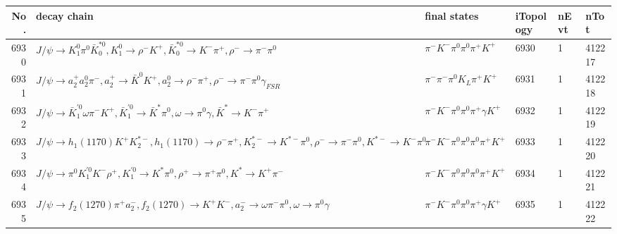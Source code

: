 \begin{table}[htbp] 
\begin{center}
\begin{small}
\begin{tabular}{rlllll}\hline\hline
 No. & decay chain & final states &  iTopology & nEvt & nTot \\\hline
6930&$J/\psi       \rightarrow K_1^{0}        \pi^{0}        \bar{K}_0^{*0}, K_1^{0}         \rightarrow \rho^{-}      K^{+}          , \bar{K}_0^{*0} \rightarrow K^{-}          \pi^{+}        , \rho^{-}       \rightarrow \pi^{-}        \pi^{0}        $&$\pi^{-}        K^{-}          \pi^{0}        \pi^{0}        \pi^{+}        K^{+}          $& 6930&    1&412217\\
6931&$J/\psi       \rightarrow a_{2}^{+}      a_{2}^{0}      \pi^{-}        , a_{2}^{+}       \rightarrow \bar{K}^{0}   K^{+}          , a_{2}^{0}       \rightarrow \rho^{-}      \pi^{+}        , \rho^{-}       \rightarrow \pi^{-}        \pi^{0}        \gamma_{FSR} $&$\pi^{-}        \pi^{-}        \pi^{0}        K_{L}          \pi^{+}        K^{+}          $& 6931&    1&412218\\
6932&$J/\psi       \rightarrow \bar{K}_1^{'0}\omega         \pi^{-}        K^{+}          , \bar{K}_1^{'0} \rightarrow \bar{K}^{*}   \pi^{0}        , \omega          \rightarrow \pi^{0}        \gamma       , \bar{K}^{*}    \rightarrow K^{-}          \pi^{+}        $&$\pi^{-}        K^{-}          \pi^{0}        \pi^{0}        \pi^{+}        \gamma       K^{+}          $& 6932&    1&412219\\
6933&$J/\psi       \rightarrow h_{1}(1170)    K^{+}          K_2^{*-}       , h_{1}(1170)     \rightarrow \rho^{-}      \pi^{+}        , K_2^{*-}        \rightarrow K^{*-}         \pi^{0}        , \rho^{-}       \rightarrow \pi^{-}        \pi^{0}        , K^{*-}          \rightarrow K^{-}          \pi^{0}        $&$\pi^{-}        K^{-}          \pi^{0}        \pi^{0}        \pi^{0}        \pi^{+}        K^{+}          $& 6933&    1&412220\\
6934&$J/\psi       \rightarrow \pi^{0}        K_1^{'0}      K^{-}          \rho^{+}      , K_1^{'0}       \rightarrow K^{*}          \pi^{0}        , \rho^{+}       \rightarrow \pi^{+}        \pi^{0}        , K^{*}           \rightarrow K^{+}          \pi^{-}        $&$\pi^{-}        K^{-}          \pi^{0}        \pi^{0}        \pi^{0}        \pi^{+}        K^{+}          $& 6934&    1&412221\\
6935&$J/\psi       \rightarrow f_{2}(1270)    \pi^{+}        a_{2}^{-}      , f_{2}(1270)     \rightarrow K^{+}          K^{-}          , a_{2}^{-}       \rightarrow \omega         \pi^{-}        \pi^{0}        , \omega          \rightarrow \pi^{0}        \gamma       $&$\pi^{-}        K^{-}          \pi^{0}        \pi^{0}        \pi^{+}        \gamma       K^{+}          $& 6935&    1&412222\\

\end{tabular}
\end{small}
\end{center}
\end{table}
